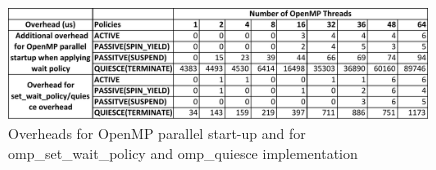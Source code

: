 \begin{figure}[ht]
    \includegraphics[width=0.99\textwidth] {images/parallel_set_quiesce_overhead}
    \caption{Overheads for OpenMP {\sf parallel} start-up and for {\sf omp\_set\_wait\_policy} and {\sf omp\_quiesce} implementation}
    \label{omp:overhead_table}
\end{figure}


